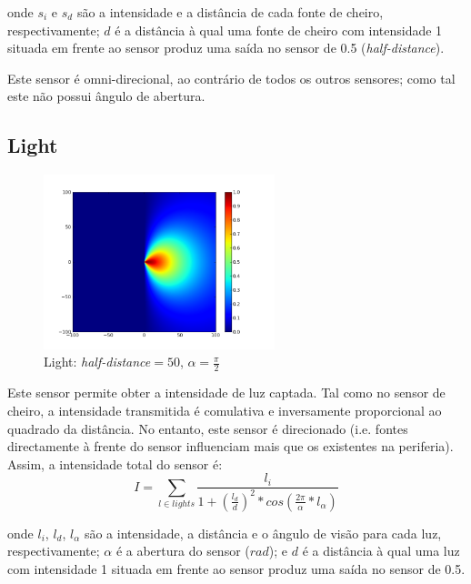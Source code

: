 \documentclass[a4paper]{article}
\begin{document}
onde $s_{i}$ e $s_{d}$ são a intensidade e a distância de cada fonte de cheiro, respectivamente; $d$ é a distância à qual uma fonte de cheiro com intensidade 1 situada em frente ao sensor produz uma saída no sensor de 0.5 (\emph{half-distance}).

Este sensor é omni-direcional, ao contrário de todos os outros sensores; como tal este não possui ângulo de abertura. 

\cleardoublepage
\subsection{Light}
\begin{figure}[h]
	\vspace{-20pt}
	\begin{center}
		\includegraphics[width=0.6\textwidth]{graphs/sensors/light.png}
	\end{center}
	\vspace{-20pt}
	\caption{Light: \emph{half-distance}$=50$, $\alpha=\frac{\pi}{2}$}
\end{figure}

\indent Este sensor permite obter a intensidade de luz captada. Tal como no sensor de cheiro, a intensidade transmitida
é comulativa e inversamente proporcional ao quadrado da distância. No entanto, este sensor é direcionado (i.e. fontes
directamente à frente do sensor influenciam mais que os existentes na periferia). Assim, a intensidade total do sensor é:
\[
	I = \displaystyle\sum\limits_{l \in lights} \frac{l_{i}}{1 + (\frac{l_{d}}{d})^{2}*cos(\frac{2\pi}{\alpha}*l_{\alpha})}
\]

onde $l_{i}$, $l_{d}$, $l_{\alpha}$ são a intensidade, a distância e o ângulo de visão para cada luz, respectivamente;
$\alpha$ é a abertura do sensor ($rad$);
e $d$ é a distância à qual uma luz com intensidade 1 situada em frente ao sensor produz uma saída no sensor de 0.5.

\cleardoublepage
\end{document}
